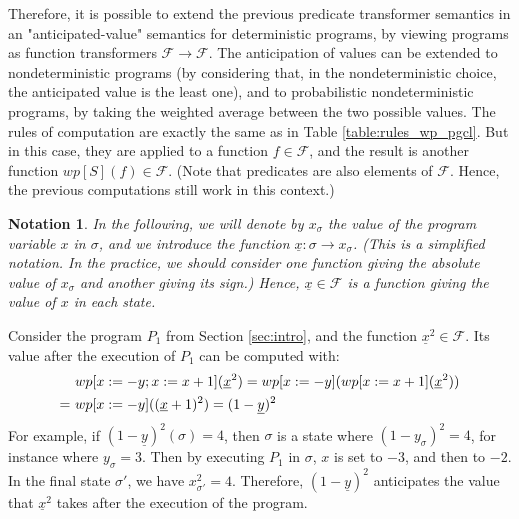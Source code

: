 \documentclass[a4paper,10pt]{llncs}
\newtheorem{notation}{Notation}
\begin{document}
Therefore, it is possible to extend the previous predicate transformer semantics in an "anticipated-value" semantics for deterministic programs, by viewing programs as function transformers $\mathcal{F} \rightarrow \mathcal{F}$.
The anticipation of values can be extended to nondeterministic programs (by considering that, in the nondeterministic choice, the anticipated value is the least one), and to probabilistic nondeterministic programs, by taking the weighted average between the two possible values. The rules of computation are exactly the same as in Table \ref{table:rules_wp_pgcl}. But in this case, they are applied to a function $f \in \mathcal{F}$, and the result is another function $wp[S](f) \in \mathcal{F}$. (Note that predicates are also elements of $\mathcal{F}$. Hence, the previous computations still work in this context.)

\begin{notation} In the following, we will denote by $x_\sigma$ the value of the program variable $x$ in $\sigma$, and we introduce the function $\underline{x} : \sigma \rightarrow x_\sigma$. (This is a simplified notation. In the practice, we should consider one function giving the absolute value of $x_\sigma$ and another giving its sign.) Hence, $\underline{x} \in \mathcal{F}$ is a function giving the value of $x$ in each state.
\end{notation}

\begin{example} Consider the program $P_1$ from Section \ref{sec:intro}, and the function $\underline{x}^2 \in \mathcal{F}$. Its value after the execution of $P_1$ can be computed with:
\begin{align*}
& \textnormal{ }wp[x := - y ; x := x+1](\underline{x}^2) = wp[x := - y ](wp[x := x+1](\underline{x}^2)) \\
 =& \textnormal{ }wp[x := - y ]((\underline{x}+1)^2) = (1-\underline{y})^2  \\
\end{align*}
For example, if $(1-\underline{y})^2(\sigma) = 4$, then $\sigma$ is a state where $(1-y_\sigma)^2 = 4$, for instance where $y_\sigma = 3$. Then by executing $P_1$ in $\sigma$, $x$ is set to $-3$, and then to $-2$. In the final state $\sigma'$, we have $x_{\sigma'}^2 = 4$. Therefore, $(1-\underline{y})^2$ anticipates the value that $\underline{x}^2$ takes after the execution of the program.
\end{example}
\end{document}
